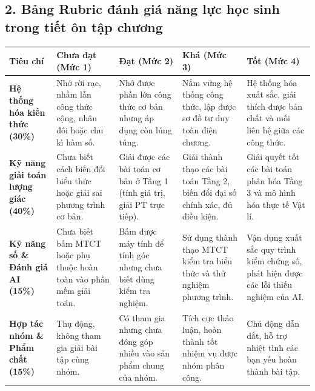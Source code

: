 \documentclass[12pt, a4paper]{article}
\begin{document}
\subsection*{2. Bảng Rubric đánh giá năng lực học sinh trong tiết ôn tập chương}  
  
\begin{center}  
\small  
\begin{tabularx}{\textwidth}{|p{2.8cm}|X|X|X|X|}  
\hline  
\textbf{Tiêu chí} & \textbf{Chưa đạt (Mức 1)} & \textbf{Đạt (Mức 2)} & \textbf{Khá (Mức 3)} & \textbf{Tốt (Mức 4)} \\ \hline  
\textbf{Hệ thống hóa kiến thức (30\%)} & Nhớ rời rạc, nhầm lẫn công thức cộng, nhân đôi hoặc chu kì hàm số. & Nhớ được phần lớn công thức cơ bản nhưng áp dụng còn lúng túng. & Nắm vững hệ thống công thức, lập được sơ đồ tư duy toàn diện chương. & Hệ thống hóa xuất sắc, giải thích được bản chất và mối liên hệ giữa các công thức. \\ \hline  
\textbf{Kỹ năng giải toán lượng giác (40\%)} & Chưa biết cách biến đổi biểu thức hoặc giải sai phương trình cơ bản. & Giải được các bài toán cơ bản ở Tầng 1 (tính giá trị, giải PT trực tiếp). & Giải thành thạo các bài toán Tầng 2, biến đổi đại số chính xác, đủ điều kiện. & Giải quyết tốt các bài toán phân hóa Tầng 3 và mô hình hóa thực tế Vật lí. \\ \hline  
\textbf{Kỹ năng số \& Đánh giá AI (15\%)} & Chưa biết bấm MTCT hoặc phụ thuộc hoàn toàn vào phần mềm giải toán. & Bấm được máy tính để tính góc nhưng chưa biết dùng kiểm tra nghiệm. & Sử dụng thành thạo MTCT kiểm tra biểu thức và thử nghiệm phương trình. & Vận dụng xuất sắc quy trình kiểm chứng số, phát hiện được các lỗi thiếu nghiệm của AI. \\ \hline  
\textbf{Hợp tác nhóm \& Phẩm chất (15\%)} & Thụ động, không tham gia giải bài tập cùng nhóm. & Có tham gia nhưng chưa đóng góp nhiều vào sản phẩm chung của nhóm. & Tích cực thảo luận, hoàn thành tốt nhiệm vụ được nhóm phân công. & Chủ động dẫn dắt, hỗ trợ nhiệt tình các bạn yếu hoàn thành bài tập. \\ \hline  
\end{tabularx}  
\end{center}  
  
\end{document}
